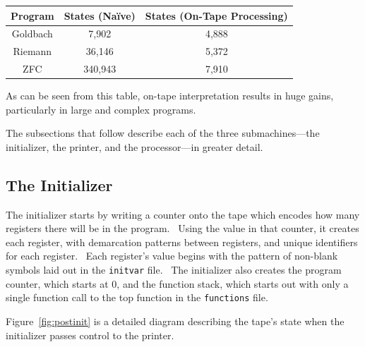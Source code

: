\documentclass[11pt]{article}
\newcommand{\statenum}{7,910 }
\newcommand{\gbstatenum}{4,888 }
\newcommand{\rmstatenum}{5,372 }
\begin{document}
\begin{center}
    \begin{tabular}{||c c c||}
    \hline
    Program & States (Na\"ive) & States (On-Tape Processing) \\ [0.5ex]
    \hline
    Goldbach & 7,902 & \gbstatenum\\
    \hline
    Riemann & 36,146 & \rmstatenum\\
    \hline
    ZFC & 340,943 & \statenum\\
    \hline
    \end{tabular}
\end{center}

As can be seen from this table, on-tape interpretation results in huge gains, particularly in large and complex programs.

The subsections that follow describe each of the three submachines---the initializer, the printer, and the processor---in greater detail.

\subsection{The Initializer}

The initializer starts by writing a counter onto the tape which encodes how many registers there will be in the program. \ Using the value in that counter, it creates each register, with demarcation patterns between registers, and unique identifiers for each register. \ Each register's value begins with the pattern of non-blank symbols laid out in the \texttt{initvar} file. \ The initializer also creates the program counter, which starts at 0, and the function stack, which starts out with only a single function call to the top function in the \texttt{functions} file.

Figure~\ref{fig:postinit} is a detailed diagram describing the tape's state when the initializer passes control to the printer.
\end{document}
